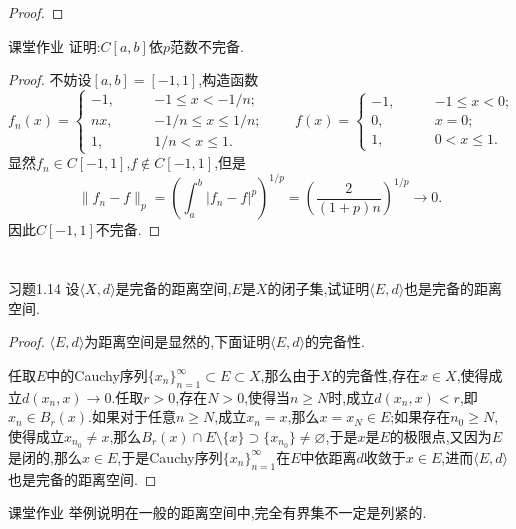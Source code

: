 \documentclass[lang = cn, scheme = chinese]{elegantbook}
\begin{document}
\begin{proof}
	\end{proof}
	
	\begin{proposition}{课堂作业}
		证明:$C[a,b]$依$p$范数不完备.
	\end{proposition}
	
	\begin{proof}
		不妨设$[a,b]=[-1,1]$,构造函数
		$$
		f_n(x)=\begin{cases}
			-1, \qquad & -1\le x<-1/n;\\
			nx, \qquad & -1/n\le x\le 1/n;\\
			1, \qquad & 1/n< x\le 1.
		\end{cases}\qquad 
		f(x)=\begin{cases}
			-1, \qquad & -1\le x<0;\\
			0, \qquad & x=0;\\
			1, \qquad & 0< x\le 1.
		\end{cases}
		$$
		显然$f_n\in C[-1,1]$,$f\notin C[-1,1]$,但是
		$$
		\|f_n-f\|_p=\left(\int_{a}^{b}|f_n-f|^p\right)^{1/p}=\left(\frac{2}{(1+p)n}\right)^{1/p}\to 0.
		$$
		因此$C[-1,1]$不完备.
	\end{proof}
	
	
	\chapter{}
	
	\begin{proposition}{习题1.14}
		设$\langle X,d \rangle$是完备的距离空间,$E$是$X$的闭子集,试证明$\langle E,d \rangle$也是完备的距离空间.
	\end{proposition}
	
	\begin{proof}
		$\langle E,d \rangle$为距离空间是显然的,下面证明$\langle E,d \rangle$的完备性.
		
		任取$E$中的Cauchy序列$\{x_n\}_{n=1}^\infty \subset E \subset X$,那么由于$X$的完备性,存在$x\in X$,使得成立$d(x_n,x)\to0$.任取$r>0$,存在$N>0$,使得当$n\ge N$时,成立$d(x_n,x)<r$,即$x_n\in B_r(x)$.如果对于任意$n\ge N$,成立$x_n=x$,那么$x=x_N\in E$;如果存在$n_0\ge N$,使得成立$x_{n_0}\ne x$,那么$B_r(x)\cap E \setminus \{x\} \supset \{ x_{n_0} \}\ne\varnothing$,于是$x$是$E$的极限点,又因为$E$是闭的,那么$x\in E$,于是Cauchy序列$\{x_n\}_{n=1}^\infty$在$E$中依距离$d$收敛于$x\in E$,进而$\langle E,d \rangle$也是完备的距离空间.
	\end{proof}
	
	\begin{proposition}{课堂作业}
		举例说明在一般的距离空间中,完全有界集不一定是列紧的.
	\end{proposition}
	
\end{document}
